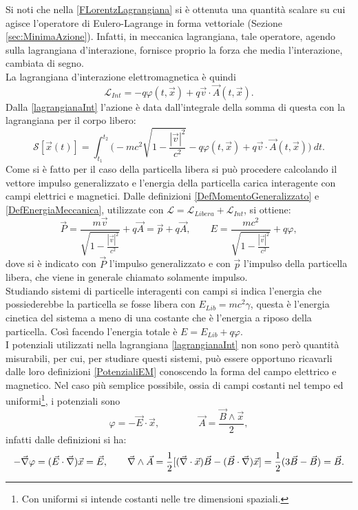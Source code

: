 Si noti che nella \eqref{FLorentzLagrangiana} si è ottenuta una quantità scalare su cui agisce l'operatore di Eulero-Lagrange in forma vettoriale (Sezione \ref{sec:MinimaAzione}). Infatti, in meccanica lagrangiana, tale operatore, agendo sulla lagrangiana d'interazione, fornisce proprio la forza che media l'interazione, cambiata di segno.\\ La lagrangiana d'interazione elettromagnetica è quindi
\begin{equation}
    \label{lagrangianaInt}
    \mathcal{L}_{Int}=-q\varphi(t,\vec x)+q\vec v\cdot\vec A(t,\vec x).
\end{equation}
Dalla \eqref{lagrangianaInt} l'azione è data dall'integrale della somma di questa con la lagrangiana per il corpo libero:
\begin{equation}
    \mathcal{S} [\vec x(t)]=\int_{t_1}^{t_2}\bigg(-mc^2\sqrt{1-\frac{|\vec v|^2}{c^2}}-q\varphi(t,\vec x)+q\vec v\cdot\vec A(t,\vec x)\bigg)\ dt.\label{AzioneFree+Int}
\end{equation}
Come si è fatto per il caso della particella libera si può procedere calcolando il vettore impulso generalizzato e l'energia della particella carica interagente con campi elettrici e magnetici. Dalle definizioni \eqref{DefMomentoGeneralizzato} e \eqref{DefEnergiaMeccanica}, utilizzate con $\mathcal{L} =\mathcal{L}_{Libera}+\mathcal{L}_{Int}$, si ottiene:
\begin{equation}
    \vec{P}=\frac{m\vec v}{\sqrt{1-\frac{|\vec v|^2}{c^2}}}+q\vec A=\vec{p}+q\vec A,\qquad E=\frac{mc^2}{\sqrt{1-\frac{|\vec v|^2}{c^2}}}+q\varphi,\label{energiaImpulsoIntEM}
\end{equation}
dove si è indicato con $\vec P$ l'impulso generalizzato e con $\vec p$ l'impulso della particella libera, che viene in generale chiamato solamente impulso.\\Studiando sistemi di particelle interagenti con campi si indica l'energia che possiederebbe la particella se fosse libera con $E_{Lib}=mc^2\gamma$, questa è l'energia cinetica del sistema a meno di una costante che è l'energia a riposo della particella. Così facendo l'energia totale è $E=E_{Lib}+q\varphi$.\\

I potenziali utilizzati nella lagrangiana \eqref{lagrangianaInt} non sono però quantità misurabili, per cui, per studiare questi sistemi, può essere opportuno ricavarli dalle loro definizioni \eqref{PotenzialiEM} conoscendo la forma del campo elettrico e magnetico. Nel caso più semplice possibile, ossia di campi costanti nel tempo ed uniformi\footnote{Con uniformi si intende costanti nelle tre dimensioni spaziali.}, i potenziali sono 
\begin{equation}
    \varphi=-\vec E\cdot\vec x, \qquad \qquad \vec A=\frac{\vec B\wedge \vec x}{2},\label{PotenzialiCostanti}
\end{equation}
infatti dalle definizioni si ha:
\begin{equation*}
    -\vec{\nabla}{\varphi}=(\vec E\cdot\vec{\nabla})\vec x=\vec{E},\qquad \vec{\nabla}\wedge\vec A=\frac{1}{2}[ (\vec{\nabla}\cdot\vec x)\vec B-(\vec B\cdot \vec{\nabla})\vec x]=\frac{1}{2}(3\vec B -\vec B)=\vec B.
\end{equation*}
